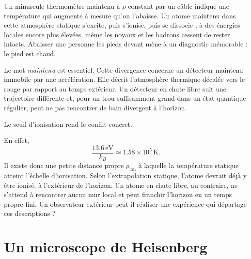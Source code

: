 Un minuscule thermomètre maintenu à \(\rho\) constant par un câble indique une température qui augmente à mesure qu’on l’abaisse. Un atome maintenu dans cette atmosphère statique s’excite, puis s’ionise, puis se dissocie ; à des énergies locales encore plus élevées, même les noyaux et les hadrons cessent de rester intacts. Abaisser une personne les pieds devant mène à un diagnostic mémorable : le pied est chaud.

Le mot \emph{maintenu} est essentiel. Cette divergence concerne un détecteur maintenu immobile par une accélération. Elle décrit l’atmosphère thermique décalée vers le rouge par rapport au temps extérieur. Un détecteur en chute libre suit une trajectoire différente et, pour un trou suffisamment grand dans un état quantique régulier, peut ne pas rencontrer de bain divergent à l’horizon.

Le seuil d’ionisation rend le conflit concret.

\begin{classroomqa}
\end{classroomqa}

En effet,
\begin{equation}
\frac{13.6\,\mathrm{eV}}{k_B}\simeq1.58\times10^5\,\mathrm{K}.
\end{equation}
Il existe donc une petite distance propre \(\rho_{\mathrm{ion}}\) à laquelle la température statique atteint l’échelle d’ionisation. Selon l’extrapolation statique, l’atome devrait déjà y être ionisé, à l’extérieur de l’horizon. Un atome en chute libre, au contraire, ne s’attend à rencontrer aucun mur local et peut franchir l’horizon en un temps propre fini. Un observateur extérieur peut-il réaliser une expérience qui départage ces descriptions ?

\section{Un microscope de Heisenberg}

